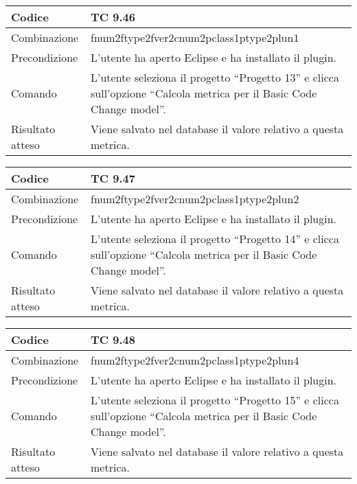 \begin{table}[ht]
\begin{tabular}{|p{3cm}|p{9cm}|}
\hline
\cellcolor{lightgray}Codice				& TC 9.46								\\
\hline
\cellcolor{lightgray}Combinazione		& fnum2ftype2fver2cnum2pclass1ptype2plun1									\\
\hline
\cellcolor{lightgray}Precondizione		& L'utente ha aperto Eclipse e ha installato il plugin.		\\
\hline
\cellcolor{lightgray}Comando			& L'utente seleziona il progetto ``Progetto 13''  e clicca sull'opzione ``Calcola metrica per il Basic Code Change model''.	\\
\hline
\cellcolor{lightgray}Risultato atteso	& Viene salvato nel database il valore relativo a questa metrica.\\
\hline
\end{tabular}
\end{table}

\begin{table}[ht]
\begin{tabular}{|p{3cm}|p{9cm}|}
\hline
\cellcolor{lightgray}Codice				& TC 9.47								\\
\hline
\cellcolor{lightgray}Combinazione		& fnum2ftype2fver2cnum2pclass1ptype2plun2									\\
\hline
\cellcolor{lightgray}Precondizione		& L'utente ha aperto Eclipse e ha installato il plugin.		\\
\hline
\cellcolor{lightgray}Comando			& L'utente seleziona il progetto ``Progetto 14''  e clicca sull'opzione ``Calcola metrica per il Basic Code Change model''.	\\
\hline
\cellcolor{lightgray}Risultato atteso	& Viene salvato nel database il valore relativo a questa metrica.\\
\hline
\end{tabular}
\end{table}

\begin{table}[ht]
\begin{tabular}{|p{3cm}|p{9cm}|}
\hline
\cellcolor{lightgray}Codice				& TC 9.48								\\
\hline
\cellcolor{lightgray}Combinazione		& fnum2ftype2fver2cnum2pclass1ptype2plun4									\\
\hline
\cellcolor{lightgray}Precondizione		& L'utente ha aperto Eclipse e ha installato il plugin.		\\
\hline
\cellcolor{lightgray}Comando			& L'utente seleziona il progetto ``Progetto 15''  e clicca sull'opzione ``Calcola metrica per il Basic Code Change model''.	\\
\hline
\cellcolor{lightgray}Risultato atteso	& Viene salvato nel database il valore relativo a questa metrica.\\
\hline
\end{tabular}
\end{table}

